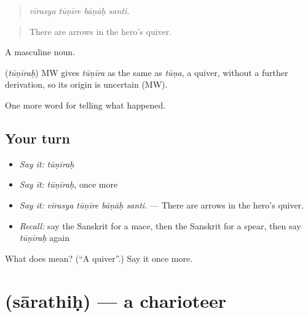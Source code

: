 \begin{quote}
   
\end{quote}

\begin{quote}
\emph{vīrasya tūṇīre bāṇāḥ santi.}
\end{quote}

\begin{quote}
There are arrows in the hero's quiver.
\end{quote}

A masculine noun.

\begin{cousinweb}
\textbf{} (\emph{tūṇīraḥ}) MW gives \emph{tūṇīra} as the same as \emph{tūṇa}, a quiver, without a further derivation, so its origin is uncertain (MW).
\end{cousinweb}

\begin{grammarlens}[title={What you've built}]
One more word for telling what happened.
\end{grammarlens}

\subsection*{Your turn}
\begin{itemize}
\raggedright
  \item \emph{Say it:} \emph{tūṇīraḥ}
  \item \emph{Say it:} \emph{tūṇīraḥ}, once more
  \item \emph{Say it:} \emph{vīrasya tūṇīre bāṇāḥ santi.} — There are arrows in the hero's quiver.
  \item \emph{Recall:} say the Sanskrit for a mace, then the Sanskrit for a spear, then say \emph{tūṇīraḥ} again
\end{itemize}

\begin{tcolorbox}[breakable,colback=teal!4,colframe=teal!35!black,title={Before you move on}]
What does  mean? (\textquotedblleft{}A quiver\textquotedblright{}.) Say it once more.
\end{tcolorbox}
\section[\texorpdfstring{\sk{सारथिः} (sārathiḥ)}{सारथिः (sārathiḥ)}]{ (sārathiḥ) — a charioteer}

\label{lesson:SA-C325-sarathih}



